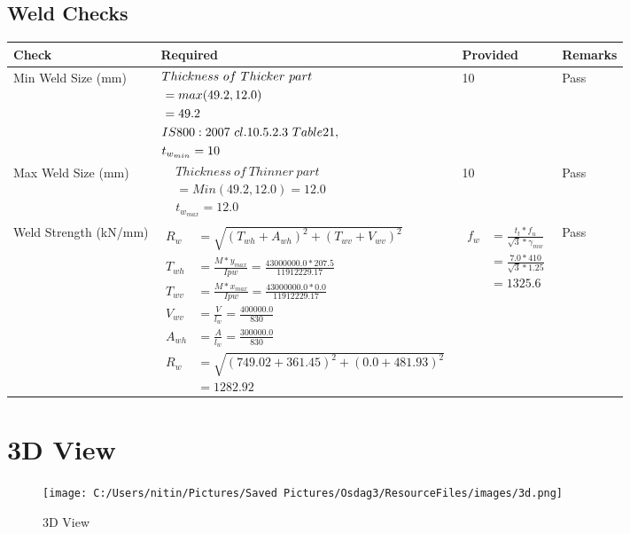 \documentclass{article}%
\begin{document}
\subsection{Weld Checks}%
\label{subsec:WeldChecks}%
\renewcommand{\arraystretch}{1.2}%
\begin{longtable}{|p{4cm}|p{7.0cm}|p{3.5cm}|p{1.5cm}|}%
\hline%
\rowcolor{OsdagGreen}%
Check&Required&Provided&Remarks\\%
\hline%
\endhead%
\hline%
Min Weld Size (mm)&$\begin{aligned} &Thickness~of~Thicker~part\\ \noindent &=max(49.2,12.0)\\ &=49.2\\ &IS800:2007~cl.10.5.2.3~Table 21,\\  &t_{w_{min}}=10\end{aligned}$&10&Pass\\%
\hline%
Max Weld Size (mm)&$\begin{aligned} & Thickness~of~Thinner~part\\ &=Min(49.2,12.0)=12.0\\ &t_{w_{max}} =12.0\end{aligned}$&10&Pass\\%
\hline%
Weld Strength (kN/mm)&$\begin{aligned} R_w&=\sqrt{(T_{wh}+A_{wh})^2 + (T_{wv}+V_{wv})^2}\\ T_{wh}&=\frac{M*y_{max}}{I{pw}}=\frac{43000000.0*207.5}{11912229.17}\\ T_{wv}&=\frac{M*x_{max}}{I{pw}}=\frac{43000000.0*0.0}{11912229.17}\\ V_{wv}&=\frac{V}{l_w}=\frac{400000.0}{830}\\ A_{wh}&=\frac{A}{l_w}=\frac{300000.0}{830}\\ R_w&=\sqrt{(749.02+361.45)^2 + (0.0+481.93)^2}\\ &=1282.92\end{aligned}$&$\begin{aligned} f_w &=\frac{t_t*f_u}{\sqrt{3}*\gamma_{mw}}\\ &=\frac{7.0*410}{\sqrt{3}*1.25}\\ &=1325.6\end{aligned}$&Pass\\%
\hline%
\end{longtable}

%
%
\newpage%
\section{3D View}%
\label{sec:3DView}%


\begin{figure}[h!]%
\centering%
\texttt{[image: C:/Users/nitin/Pictures/Saved Pictures/Osdag3/ResourceFiles/images/3d.png]}%
\caption{3D View}%
\end{figure}

%
\end{document}
